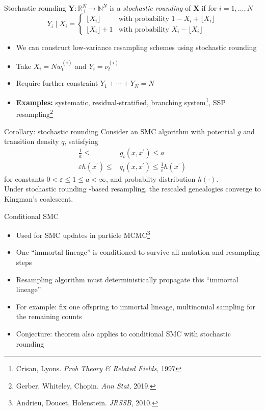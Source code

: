 \documentclass[aspectratio=169]{beamer}
\theoremstyle{definition}
\newcommand{\vt}[2][t]{\nu_{#1}^{(#2)}}
\newcommand{\wt}[2][t]{w_{#1}^{(#2)}}
\begin{document}
\begin{frame}{Stochastic rounding}
$\mathbf{Y}: \mathbb{R}_+^N \to \mathbb{N}^N$ is a \emph{stochastic rounding} of $\mathbf{X}$ if for $i=1,\dots,N$
\begin{equation*}
Y_i \mid X_i =
\begin{cases}
 \lfloor X_i \rfloor & \text{with probability } 1- X_i + \lfloor X_i \rfloor \\
  \lfloor X_i \rfloor +1 & \text{with probability } X_i - \lfloor X_i \rfloor 
\end{cases}
\end{equation*}

\begin{itemize}
\item We can construct low-variance resampling schemes using stochastic rounding
\item Take $X_i = N\wt{i}$ and $Y_i = \vt{i}$
\item Require further constraint $Y_1 + \cdots + Y_N = N$
\item \textbf{Examples:} systematic, residual-stratified, branching system\footnote{Crisan, Lyons. \textit{Prob Theory \& Related Fields,} 1997}, SSP resampling\footnote{Gerber, Whiteley, Chopin. \textit{Ann Stat,} 2019.}
\end{itemize}
\end{frame}


\begin{frame}{Corollary: stochastic rounding}
Consider an SMC algorithm with potential $g$ and transition density $q$, satisfying
\begin{align*}
\frac{1}{a} \leq &g_t(x, x^\prime) \leq a \\
\varepsilon h(x^\prime) \leq &q_t(x, x^\prime) \leq \frac{1}{\varepsilon} h(x^\prime) 
\end{align*}
for constants $0<\varepsilon\leq 1\leq a<\infty$, and probablity distribution $h(\cdot)$.\\[10pt]

Under stochastic rounding -based resampling, the rescaled genealogies converge to Kingman's coalescent.
\end{frame}


\begin{frame}{Conditional SMC}
\begin{itemize}
\item Used for SMC updates in particle MCMC\footnote{Andrieu, Doucet, Holenstein. \textit{JRSSB}, 2010.}
\item One ``immortal lineage'' is conditioned to survive all mutation and resampling steps
\item Resampling algorithm must deterministically propagate this ``immortal lineage''
\item For example: fix one offspring to immortal lineage, multinomial sampling for the remaining counts
\pause
\item Conjecture: theorem also applies to conditional SMC with stochastic rounding
\end{itemize}
\end{frame}
\end{document}
